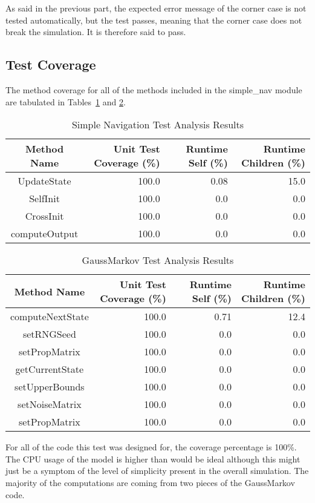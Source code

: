 As said in the previous part, the expected error message of the corner case is not tested automatically,
but the test passes, meaning that the corner case does not break the simulation. It is therefore said to
pass.



\subsection{Test Coverage}
The method coverage for all of the methods included in the simple\_nav 
module are tabulated in Tables~\ref{tab:cov_met} and \ref{tab:cov_met2}.

\begin{table}[htbp]
	\caption{Simple Navigation Test Analysis Results}
	\label{tab:cov_met}
	\centering \fontsize{10}{10}\selectfont
	\begin{tabular}{c | r | r | r} %
		\hline
		Method Name    & Unit Test Coverage (\%) & Runtime Self (\%) & Runtime Children (\%) \\
		\hline
		UpdateState & 100.0 & 0.08 & 15.0 \\
		SelfInit & 100.0 & 0.0 & 0.0 \\
		CrossInit & 100.0 & 0.0 & 0.0 \\
		computeOutput & 100.0 & 0.0 & 0.0 \\
		\hline
	\end{tabular}
\end{table}

\begin{table}[htbp]
	\caption{GaussMarkov Test Analysis Results}
	\label{tab:cov_met2}
	\centering \fontsize{10}{10}\selectfont
	\begin{tabular}{c | r | r | r} %
		\hline
		Method Name    & Unit Test Coverage (\%) & Runtime Self (\%) & Runtime Children (\%) \\
		\hline
		computeNextState & 100.0 & 0.71 & 12.4 \\
		setRNGSeed & 100.0 & 0.0 & 0.0 \\
		setPropMatrix & 100.0 & 0.0 & 0.0 \\
		getCurrentState & 100.0 & 0.0 & 0.0 \\
		setUpperBounds & 100.0 & 0.0 & 0.0 \\
		setNoiseMatrix & 100.0 & 0.0 & 0.0 \\
		setPropMatrix & 100.0 & 0.0 & 0.0 \\
		\hline
	\end{tabular}
\end{table}
For all of the code this test was designed for, the coverage percentage is 
100\%.  The CPU usage of the model is higher than would be ideal although this 
might just be a symptom of the level of simplicity present in the overall 
simulation.  The majority of the computations are coming from two pieces of the 
GaussMarkov code.  

